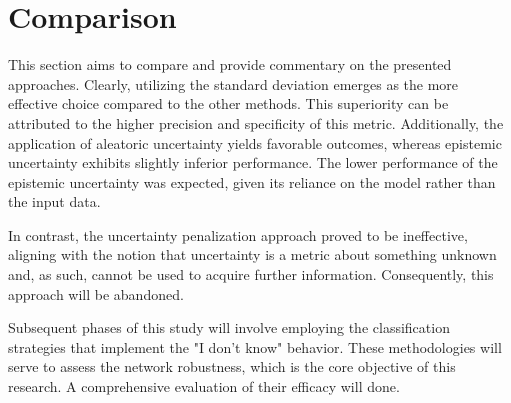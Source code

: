 \section{Comparison}

This section aims to compare and provide commentary on the presented approaches. Clearly, utilizing the standard deviation emerges as the more effective choice compared to the other methods. This superiority can be attributed to the higher precision and specificity of this metric. Additionally, the application of aleatoric uncertainty yields favorable outcomes, whereas epistemic uncertainty exhibits slightly inferior performance. The lower performance of the epistemic uncertainty was expected, given its reliance on the model rather than the input data.

In contrast, the uncertainty penalization approach proved to be ineffective, aligning with the notion that uncertainty is a metric about something unknown and, as such, cannot be used to acquire further information. Consequently, this approach will be abandoned.

Subsequent phases of this study will involve employing the classification strategies that implement the "I don't know" behavior. These methodologies will serve to assess the network robustness, which is the core objective of this research. A comprehensive evaluation of their efficacy will done.